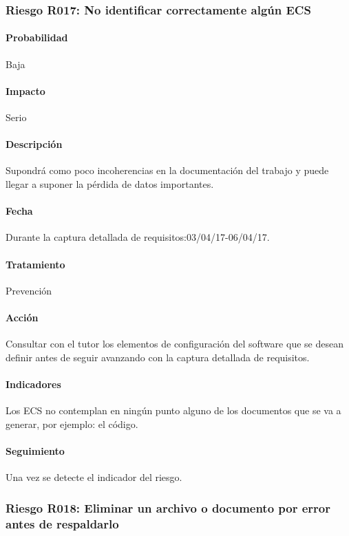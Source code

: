 \documentclass[10pt,a4paper]{article}
\begin{document}
			\subsubsection{Riesgo R017: No identificar correctamente algún ECS }
				\paragraph{Probabilidad} Baja
				\paragraph{Impacto}	Serio
				\paragraph{Descripción} Supondrá como poco incoherencias en la documentación del trabajo y puede llegar a suponer la pérdida de datos importantes.
				\paragraph{Fecha} Durante la captura detallada de requisitos:03/04/17-06/04/17. %
				\paragraph{Tratamiento} Prevención %
				\paragraph{Acción} Consultar con el tutor los elementos de configuración del software que se desean definir antes de seguir avanzando con la captura detallada de requisitos.%
				\paragraph{Indicadores} Los ECS no contemplan en ningún punto alguno de los documentos que se va a generar, por ejemplo: el código. %
				\paragraph{Seguimiento}	Una vez se detecte el indicador del riesgo.  %
			
			\subsubsection{Riesgo R018: Eliminar un archivo o documento por error antes de respaldarlo}
\end{document}
